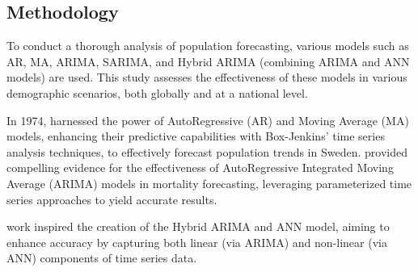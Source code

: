 \documentclass[hidelinks,11pts]{article}
\DeclareMathOperator{\1}{\mathbbm{1}}
\begin{document}





\subsection{Methodology}
To conduct a thorough analysis of population forecasting, various models such as AR, MA, ARIMA, SARIMA, and Hybrid ARIMA (combining ARIMA and ANN models) are used. This study assesses the effectiveness of these models in various demographic scenarios, both globally and at a national level.


In 1974, \cite{saboia1974modeling} harnessed the power of AutoRegressive (AR) and Moving Average (MA) models, enhancing their predictive capabilities with Box-Jenkins' time series analysis techniques, to effectively forecast population trends in Sweden. \cite{mcnown1989forecasting} provided compelling evidence for the effectiveness of AutoRegressive Integrated Moving Average (ARIMA) models in mortality forecasting, leveraging parameterized time series approaches to yield accurate results.

\cite{zhang2003time} work inspired the creation of the Hybrid ARIMA and ANN model, aiming to enhance accuracy by capturing both linear (via ARIMA) and non-linear (via ANN) components of time series data. 
\end{document}
